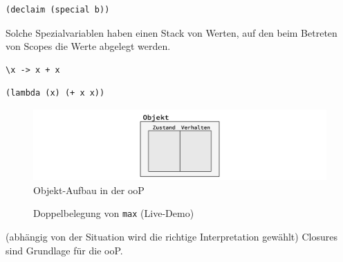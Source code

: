 		\lstLisp[Spezialvariablen]
		\begin{lstlisting}
(declaim (special b))
		\end{lstlisting}

		Solche Spezialvariablen haben einen Stack von Werten, auf den beim Betreten von Scopes die Werte abgelegt werden.

	\begin{lstlisting}
\x -> x + x
		\end{lstlisting}

		\begin{lstlisting}
(lambda (x) (+ x x))
		\end{lstlisting}

		\begin{figure}[H]
			\caption{Objekt-Aufbau in der ooP}
			\includegraphics[width=\textwidth]{workfiles/v11_2}
		\end{figure}

		\begin{figure}[H]
			\centering
			\caption{Doppelbelegung von \texttt{max} (Live-Demo)}
		\end{figure}
(abhängig von der Situation wird die richtige Interpretation gewählt)
		Closures sind Grundlage für die ooP.

		\begin{figure}[H]
		\end{figure}


